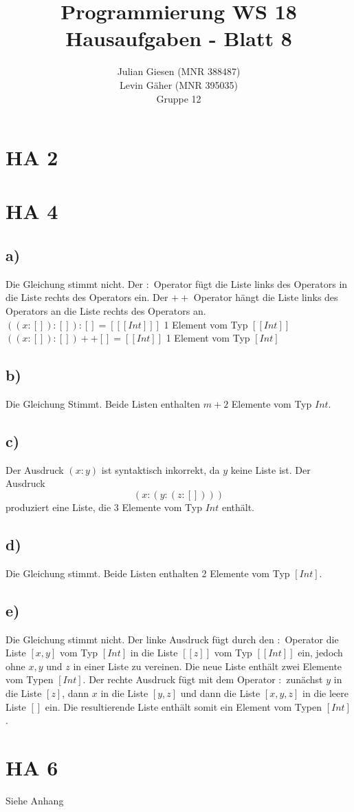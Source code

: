 \documentclass[a4paper]{article}
\title{ Programmierung WS 18 \\ Hausaufgaben - Blatt 8 }
\author{ Julian Giesen (MNR 388487) \\
Levin Gäher (MNR 395035) \\
Gruppe 12 }
\date{  }
\begin{document}
\maketitle
\section*{HA 2 }

\section*{HA 4}
\subsection*{a)}
Die Gleichung stimmt nicht. Der $:$ Operator fügt die Liste links des Operators in die Liste rechts des Operators ein. Der $++$ Operator hängt die Liste links des Operators an die Liste rechts des Operators an.\\
$((x:[]) : []) : [] = [[[Int]]]$ 1 Element vom Typ $[[Int]]$\\
$((x : []) : []) ++ [] = [[Int]]$ 1 Element vom Typ $[Int]$
\subsection*{b)}
Die Gleichung Stimmt. Beide Listen enthalten $m+2$ Elemente vom Typ $Int$. 
\subsection*{c)}
Der Ausdruck $(x : y)$ ist syntaktisch inkorrekt, da $y$ keine Liste ist. Der Ausdruck $$(x : (y : (z : [])))$$ produziert eine Liste, die 3 Elemente vom Typ $Int$ enthält.
\subsection*{d)}
Die Gleichung stimmt. Beide Listen enthalten 2 Elemente vom Typ $[Int]$.
\subsection*{e)}
Die Gleichung stimmt nicht. Der linke Ausdruck fügt durch den $:$ Operator die Liste $[x,y]$ vom Typ $[Int]$ in die Liste $[[z]]$ vom Typ $[[Int]]$ ein, jedoch ohne $x,y$ und $z$ in einer Liste zu vereinen. Die neue Liste enthält zwei Elemente vom Typen $[Int]$. Der rechte Ausdruck fügt mit dem Operator $:$ zunächst $y$ in die Liste $[z]$, dann $x$ in die Liste $[y,z]$ und dann die Liste $[x,y,z]$ in die leere Liste $[]$ ein. Die resultierende Liste enthält somit ein Element vom Typen $[Int]$.
\section*{HA 6}
Siehe Anhang
\end{document}
